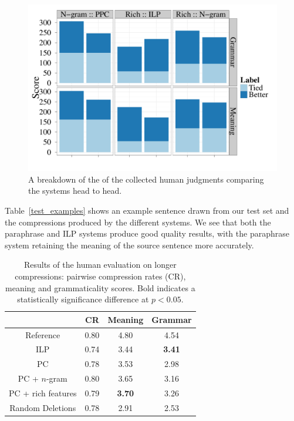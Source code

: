 \documentclass[11pt]{article}
\begin{document}
\begin{figure}[!t]
\begin{center}
\includegraphics[width=0.99\linewidth]{figures/pairwise_comparison.pdf}
\end{center}
\caption{A breakdown of the of the collected human judgments comparing
  the systems head to head.}\label{num-ties-wins}
\end{figure}

Table~\ref{test_examples} shows an example sentence drawn from our
test set and the compressions produced by the different systems. We
see that both the paraphrase and ILP systems produce good quality
results, with the paraphrase system retaining the meaning of the
source sentence more accurately.

 \begin{table}
   \small
   \begin{center}
     \begin{tabular}{|c|c|c|c|}
       \hline
       & CR & Meaning & Grammar \\
       \hline
       Reference & 0.80 &  4.80 & 4.54 \\
       \hline
       ILP & 0.74 & 3.44 & {\bf 3.41} \\
       \hline
       \hline
       PC & 0.78 & 3.53 & 2.98 \\
       \hline
       PC + $n$-gram & 0.80 & 3.65 & 3.16 \\
       PC  + rich features & 0.79 & {\bf 3.70} & 3.26 \\
       \hline
       \hline
       Random Deletions & 0.78 & 2.91 & 2.53 \\
       \hline
     \end{tabular}
   \end{center}
   \normalsize
   \caption{Results of the human evaluation on longer compressions:
     pairwise compression rates (CR), meaning and grammaticality scores. 
     Bold indicates a statistically significance difference at $p <
     0.05$.}
   \label{human_judgments}
 \end{table}
\end{document}
